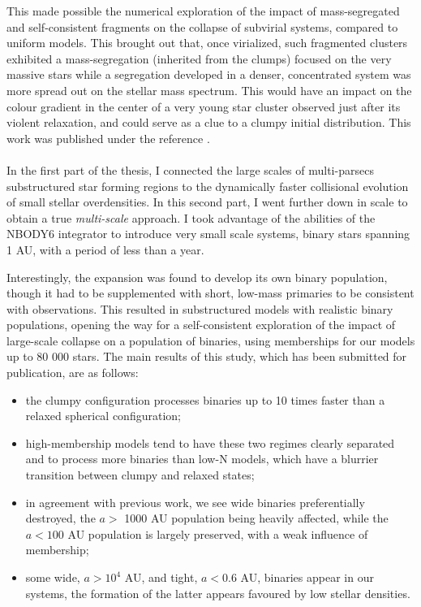 This made possible the numerical exploration of the impact of mass-segregated and self-consistent fragments on the collapse of subvirial systems, compared to uniform models.  This brought out that, once virialized, such fragmented clusters exhibited a mass-segregation (inherited from the clumps) focused on the very massive stars while a segregation developed in a denser, concentrated system was more spread out on the stellar mass spectrum. This would have an impact on the colour gradient in the center of a very young star cluster  observed just after its violent relaxation, and could serve as a clue to a clumpy initial distribution. This work was published under the reference \cite{Dorval2016}.



\paragraph*{}
In the first part of the thesis, I connected the large scales of multi-parsecs substructured star forming regions to the dynamically faster collisional evolution of small stellar overdensities. In this second part, I went further down in scale to obtain a true \textit{multi-scale} approach. I took advantage of the abilities of the NBODY6 integrator to introduce very small scale systems, binary stars spanning 1 AU, with a period of less than a year.

Interestingly, the \HubLem expansion was found to develop its own binary population, though it had to be supplemented with short, low-mass primaries to be consistent with observations. This resulted in substructured models with realistic binary populations, opening the way for a self-consistent exploration of the impact of large-scale collapse on a population of binaries, using memberships for our models up to 80 000 stars. The main results of this study, which has been submitted for publication, are as follows:

\begin{itemize}
\item the clumpy configuration processes binaries up to 10 times faster than a relaxed spherical configuration;
\item high-membership models tend to have these two regimes clearly separated and to process more binaries than low-N models, which have a blurrier transition between clumpy and relaxed states;
\item in agreement with previous work, we see wide binaries preferentially destroyed, the $a >$ 1000 AU population being heavily affected, while the $a < 100$ AU population is largely preserved, with a weak influence of membership;
\item some wide, $a > 10^4$ AU, and tight, $a < 0.6$ AU, binaries appear in our systems, the formation of the latter appears favoured by low stellar densities.
\end{itemize}

